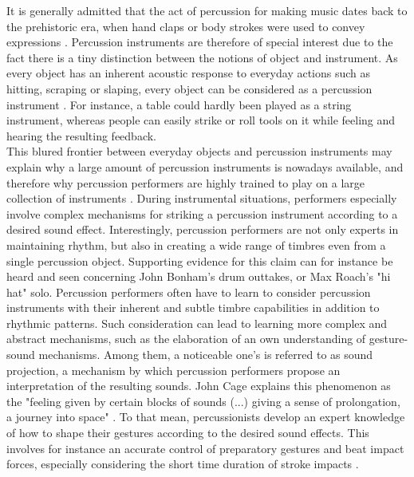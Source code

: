 It is generally admitted that the act of percussion for making music dates back to the prehistoric era, when hand claps or body strokes were used to convey expressions . Percussion instruments are therefore of special interest due to the fact there is a tiny distinction between the notions of object and instrument. As every object has an inherent acoustic response to everyday actions such as hitting, scraping or slaping, every object can be considered as a percussion instrument . For instance, a table could hardly been played as a string instrument, whereas people can easily strike or roll tools on it while feeling and hearing the resulting feedback.\\

This blured frontier between everyday objects and percussion instruments may explain why a large amount of percussion instruments is nowadays available, and therefore why percussion performers are highly trained to play on a large collection of instruments . During instrumental situations, performers especially involve complex mechanisms for striking a percussion instrument according to a desired sound effect. Interestingly, percussion performers are not only experts in maintaining rhythm, but also in creating a wide range of timbres even from a single percussion object. Supporting evidence for this claim can for instance be heard and seen concerning John Bonham's drum outtakes, or Max Roach's "hi hat" solo. Percussion performers often have to learn to consider percussion instruments with their inherent and subtle timbre capabilities in addition to rhythmic patterns. Such consideration can lead to learning more complex and abstract mechanisms, such as the elaboration of an own understanding of gesture-sound mechanisms. Among them, a noticeable one's is referred to as sound projection, a mechanism by which percussion performers propose an interpretation of the resulting sounds. John Cage explains this phenomenon as the "feeling given by certain blocks of sounds (...) giving a sense of prolongation, a journey into space" . To that mean, percussionists develop an expert knowledge of how to shape their gestures according to the desired sound effects. This involves for instance an accurate control of preparatory gestures and beat impact forces, especially considering the short time duration of stroke impacts .\\

